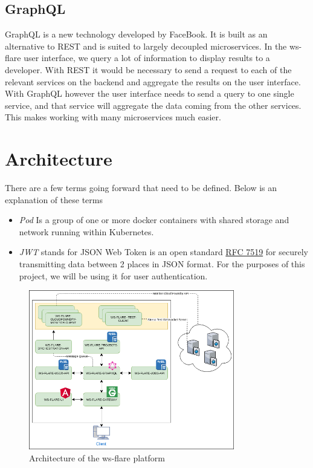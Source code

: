 \subsection{GraphQL}

GraphQL is a new technology developed by FaceBook. It is built as an alternative to REST and is suited to largely decoupled microservices. In the ws-flare user interface, we query a lot of information to display results to a developer. With REST it would be necessary to send a request to each of the relevant services on the backend and aggregate the results on the user interface. With GraphQL however the user interface needs to send a query to one single service, and that service will aggregate the data coming from the other services. This makes working with many microservices much easier.

\section{Architecture}

There are a few terms going forward that need to be defined. Below is an explanation of these terms

\begin{itemize}
  \item \emph{Pod} Is a group of one or more docker containers with shared storage and network running within Kubernetes.
  \item \emph{JWT} stands for JSON Web Token is an open standard \href{https://tools.ietf.org/html/rfc7519}{RFC 7519} for securely transmitting data between 2 places in JSON format. For the purposes of this project, we will be using it for user authentication.
\end{itemize}

\begin{figure}[!h]
  \centering
    \includegraphics[width=0.8\textwidth]{figures/architecture.png}
    \caption{Architecture of the ws-flare platform}
    \label{fig:https-handshake}
\end{figure}

